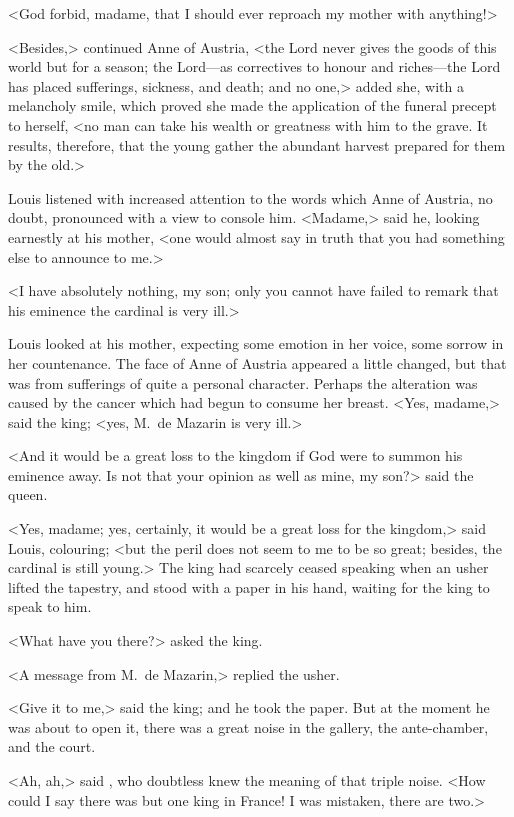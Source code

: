 <God forbid, madame, that I should ever reproach my mother with anything!>

<Besides,> continued Anne of Austria, <the Lord never gives the goods of this world but for a season; the Lord—as correctives to honour and riches—the Lord has placed sufferings, sickness, and death; and no one,> added she, with a melancholy smile, which proved she made the application of the funeral precept to herself, <no man can take his wealth or greatness with him to the grave. It results, therefore, that the young gather the abundant harvest prepared for them by the old.>

Louis listened with increased attention to the words which Anne of Austria, no doubt, pronounced with a view to console him. <Madame,> said he, looking earnestly at his mother, <one would almost say in truth that you had something else to announce to me.>

<I have absolutely nothing, my son; only you cannot have failed to remark that his eminence the cardinal is very ill.>

Louis looked at his mother, expecting some emotion in her voice, some sorrow in her countenance. The face of Anne of Austria appeared a little changed, but that was from sufferings of quite a personal character. Perhaps the alteration was caused by the cancer which had begun to consume her breast. <Yes, madame,> said the king; <yes, M.~de Mazarin is very ill.>

<And it would be a great loss to the kingdom if God were to summon his eminence away. Is not that your opinion as well as mine, my son?> said the queen.

<Yes, madame; yes, certainly, it would be a great loss for the kingdom,> said Louis, colouring; <but the peril does not seem to me to be so great; besides, the cardinal is still young.> The king had scarcely ceased speaking when an usher lifted the tapestry, and stood with a paper in his hand, waiting for the king to speak to him.

<What have you there?> asked the king.

<A message from M.~de Mazarin,> replied the usher.

<Give it to me,> said the king; and he took the paper. But at the moment he was about to open it, there was a great noise in the gallery, the ante-chamber, and the court.

<Ah, ah,> said , who doubtless knew the meaning of that triple noise. <How could I say there was but one king in France! I was mistaken, there are two.>

